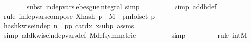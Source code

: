 \begin{isabellebody}
\ \ \ \ \ \ \isamarkupfalse%
\ {\isacharparenleft}{\kern0pt}subst\ indep{\isacharunderscore}{\kern0pt}vars{\isacharunderscore}{\kern0pt}lebesgue{\isacharunderscore}{\kern0pt}integral{\isacharcomma}{\kern0pt}\ simp{\isacharparenright}{\kern0pt}\isanewline
\ \ \ \ \ \ \ \ \isamarkupfalse%
\ {\isacharparenleft}{\kern0pt}simp\ add{\isacharcolon}{\kern0pt}h{\isacharunderscore}{\kern0pt}def{\isacharparenright}{\kern0pt}\isanewline
\ \ \ \ \ \ \ \ \isamarkupfalse%
\ {\isacharparenleft}{\kern0pt}rule\ indep{\isacharunderscore}{\kern0pt}vars{\isacharunderscore}{\kern0pt}compose{}{\isacharbrackleft}{\kern0pt}\ X{\isacharequal}{\kern0pt}{\isachardoublequoteopen}hash\ p{\isachardoublequoteclose}\ \ M{\isacharprime}{\kern0pt}{\isacharequal}{\kern0pt}{\isachardoublequoteopen}\ {\isacharparenleft}{\kern0pt}{\isasymlambda}{\isacharunderscore}{\kern0pt}{\isachardot}{\kern0pt}\ pmf{\isacharunderscore}{\kern0pt}of{\isacharunderscore}{\kern0pt}set\ {\isacharbraceleft}{\kern0pt}{}{\isachardot}{\kern0pt}{\isachardot}{\kern0pt}{\isacharless}{\kern0pt}p{\isacharbraceright}{\kern0pt}{\isacharparenright}{\kern0pt}{\isachardoublequoteclose}{\isacharbrackright}{\kern0pt}{\isacharparenright}{\kern0pt}\isanewline
\ \ \ \ \ \ \ \ \ \isamarkupfalse%
\ hash{\isacharunderscore}{\kern0pt}k{\isacharunderscore}{\kern0pt}wise{\isacharunderscore}{\kern0pt}indep{\isacharbrackleft}{\kern0pt}\ n{\isacharequal}{\kern0pt}{\isachardoublequoteopen}{}{\isachardoublequoteclose}\ \ p{\isacharequal}{\kern0pt}{\isachardoublequoteopen}p{\isachardoublequoteclose}{\isacharbrackright}{\kern0pt}\ card{\isacharunderscore}{\kern0pt}x\ x{\isacharunderscore}{\kern0pt}sub{\isacharunderscore}{\kern0pt}p\ assms{\isacharparenleft}{\kern0pt}{}{\isacharparenright}{\kern0pt}\isanewline
\ \ \ \ \ \ \ \ \ \isamarkupfalse%
\ {\isacharparenleft}{\kern0pt}simp\ add{\isacharcolon}{\kern0pt}k{\isacharunderscore}{\kern0pt}wise{\isacharunderscore}{\kern0pt}indep{\isacharunderscore}{\kern0pt}vars{\isacharunderscore}{\kern0pt}def\ M{\isacharunderscore}{\kern0pt}def{\isacharbrackleft}{\kern0pt}symmetric{\isacharbrackright}{\kern0pt}{\isacharparenright}{\kern0pt}\isanewline
\ \ \ \ \ \ \ \ \isamarkupfalse%
\ simp\isanewline
\ \ \ \ \ \ \ \isamarkupfalse%
\ {\isacharparenleft}{\kern0pt}rule\ int{\isacharunderscore}{\kern0pt}M{\isacharparenright}{\kern0pt}\isanewline
\ \ \ \ \ \ \isamarkupfalse%

\end{isabellebody}
